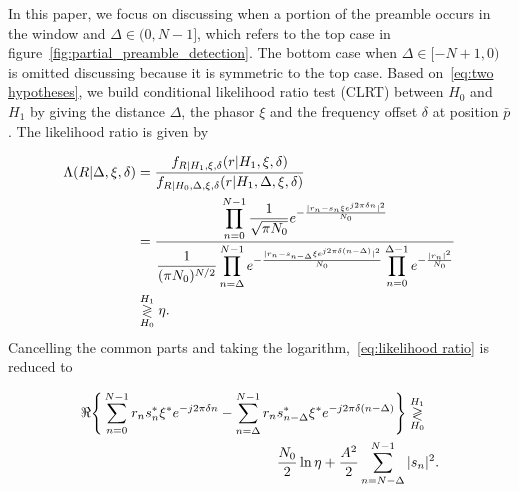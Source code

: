 
In this paper, we focus on discussing when a portion of the preamble 
occurs in the window and $\Delta{\in}(0,N{-}1]$, which refers to
the top case in figure~\ref{fig:partial_preamble_detection}.
The bottom case when 
$\Delta{\in}[-N{+}1,0)$ 
is omitted discussing because it is symmetric to the top case.
Based on~\eqref{eq:two hypotheses}, we build conditional likelihood ratio test (CLRT)
between $H_0$ and $H_1$ by giving the distance $\Delta$, 
the phasor $\xi$ and the frequency offset $\delta$ at position $\bar{p}$. The likelihood ratio is given by

\begin{equation}
    \label{eq:likelihood ratio}
    \begin{aligned}
    \Lambda(R|\Delta,\xi,\delta)&=\frac{f_{R|H_1,\xi,\delta}(r|H_1,\xi,\delta)}{f_{R|H_0,\Delta,\xi,\delta}(r|H_1,\Delta,\xi,\delta)} \\
    &=\frac{\displaystyle \prod_{n=0}^{N-1}\frac{1}{\sqrt{\pi N_0}}e^{-\frac{|r_n-s_n\xi e^{j2\pi\delta n}|^2}{N_0}}}{\displaystyle \frac{1}{(\pi N_0)^{N/2}}\prod_{n=\Delta}^{N-1}e^{-\frac{|r_n-s_{n-\Delta}\xi e^{j2\pi\delta (n-\Delta)}|^2}{N_0}}\prod_{n=0}^{\Delta-1}e^{-\frac{|r_n|^2}{N_0}}} \\
    & \mathrel{\mathop\gtrless\limits^{H_1}_{H_0}} \eta.
    \end{aligned}
  \end{equation}
Cancelling the common parts and taking the logarithm,~\eqref{eq:likelihood ratio} is reduced to

\begin{equation}
    \label{eq:log likelihood}
    \begin{aligned}
    \Re\Bigg\{\sum_{n=0}^{N-1}r_ns_n^*\xi^*e^{-j2\pi\delta n}-\sum_{n=\Delta}^{N-1}r_n&s_{n-\Delta}^*\xi^*e^{-j2\pi\delta(n-\Delta)}\Bigg\} \mathrel{\mathop\gtrless\limits^{H_1}_{H_0}} \\
    &\frac{N_0}{2}\ln\eta+\frac{A^2}{2}\sum_{n=N-\Delta}^{N-1}|s_n|^2.
    \end{aligned}
\end{equation}

